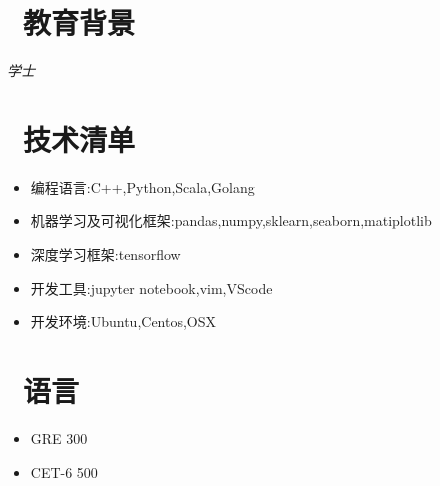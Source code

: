 \documentclass{resume}
\begin{document}
\section{\faGraduationCap\  教育背景}


\textit{学士}\ 

\section{\faCogs\ 技术清单}
\begin{itemize}[parsep=0.5ex]
  \item 编程语言:C++,Python,Scala,Golang
  \item 机器学习及可视化框架:pandas,numpy,sklearn,seaborn,matiplotlib
  \item 深度学习框架:tensorflow
  \item 开发工具:jupyter notebook,vim,VScode 
  \item 开发环境:Ubuntu,Centos,OSX
\end{itemize}


\section{\faInfo\ 语言}
\begin{itemize}[parsep=0.5ex]
  \item GRE 300
  \item CET-6 500
\end{itemize}

%
%
\end{document}
